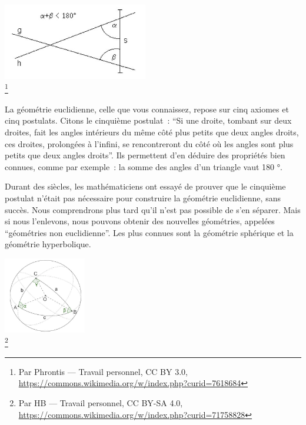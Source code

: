 \documentclass[
  10pt,
  french,
  a5paper,
  openany]{book}
\begin{document}
\begin{center}
\includegraphics[width=\textwidth,height=9em]{images/la-geometrie-non-euclidienne-1.jpg}\\
\footnote{Par Phrontis --- Travail personnel, CC BY 3.0, \url{https://commons.wikimedia.org/w/index.php?curid=7618684}}

\end{center}

La géométrie euclidienne, celle que vous connaissez, repose sur cinq axiomes et cinq postulats. Citons le cinquième postulat~: ``Si une droite, tombant sur deux droites, fait les angles intérieurs du même côté plus petits que deux angles droits, ces droites, prolongées à l'infini, se rencontreront du côté où les angles sont plus petits que deux angles droits''. Ils permettent d'en déduire des propriétés bien connues, comme par exemple~: la somme des angles d'un triangle vaut 180 °.

Durant des siècles, les mathématiciens ont essayé de prouver que le cinquième postulat n'était pas nécessaire pour construire la géométrie euclidienne, sans succès. Nous comprendrons plus tard qu'il n'est pas possible de s'en séparer. Mais si nous l'enlevons, nous pouvons obtenir des nouvelles géométries, appelées ``géométries non euclidienne''. Les plus connues sont la géométrie sphérique et la géométrie hyperbolique.

\begin{center}
\includegraphics[width=\textwidth,height=9em]{images/la-geometrie-non-euclidienne-2.jpg}\\
\footnote{Par HB --- Travail personnel, CC BY-SA 4.0, \url{https://commons.wikimedia.org/w/index.php?curid=71758828}}

\end{center}
\end{document}
